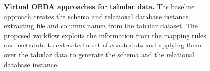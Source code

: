 \begin{figure}[th]
  \centering
\caption[Virtual OBDA approaches for tabular data]{\textbf{Virtual OBDA approaches for tabular data.} The baseline approach creates the schema and relational database instance extracting file and columns names from the tabular dataset. The proposed workflow exploits the information from the mapping rules and metadata to extracted a set of constraints and applying them over the tabular data to generate the schema and the relational database instance.}
\label{fig:obda}
\end{figure}


